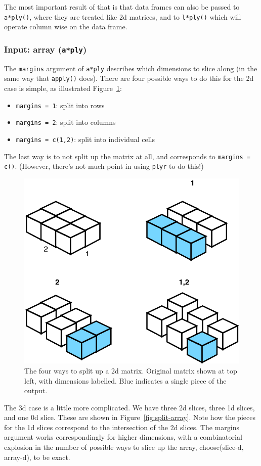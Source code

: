\documentclass[letterpage]{scrartcl}
\newcommand{\code}[1]{\lstinline!#1!}
\newcommand{\f}[1]{\lstinline!#1()!}
\begin{document}
The most important result of that is that data frames can also be passed to \f{a*ply}, where they are treated like 2d matrices, and to \f{l*ply} which will operate column wise on the data frame.

\subsubsection{Input: array ({\tt a*ply})}

The {\tt margins} argument of {\tt a*ply} describes which dimensions to slice along (in the same way that \f{apply} does).  There are four possible ways to do this for the 2d case is simple, as illustrated Figure~\ref{fig:split-matrix}:

\begin{itemize}
  \item \code{margins = 1}: split into rows
  \item \code{margins = 2}: split into columns
  \item \code{margins = c(1,2)}: split into individual cells
\end{itemize}

\noindent The last way is to not split up the matrix at all, and corresponds to \code{margins = c()}.  (However, there's not much point in using {\tt plyr} to do this!)

\begin{figure}[htbp]
  \centering
    \includegraphics[width= 0.35 \textwidth]{split-matrix}
  \caption{The four ways to split up a 2d matrix.  Original matrix shown at top left, with dimensions labelled.  Blue indicates a single piece of the output.}
  \label{fig:split-matrix}
\end{figure}

The 3d case is a little more complicated.  We have three 2d slices, three 1d slices, and one 0d slice.  These are shown in Figure~\ref{fig:split-array}.  Note how the pieces for the 1d slices correspond to the intersection of the 2d slices.  The margins argument works correspondingly for higher dimensions, with a combinatorial explosion in the number of possible ways to slice up the array, choose(slice-d, array-d), to be exact.
\end{document}
